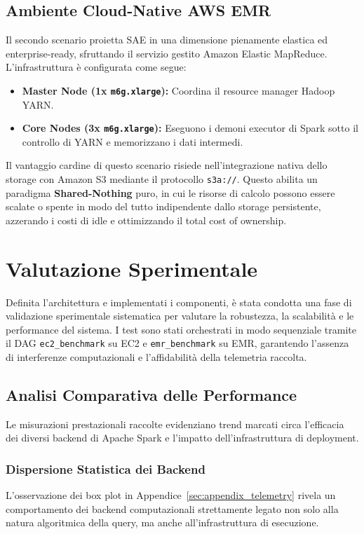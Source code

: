 \documentclass[conference]{IEEEtran}
\begin{document}
\subsection{Ambiente Cloud-Native AWS EMR}
Il secondo scenario proietta SAE in una dimensione pienamente elastica ed enterprise-ready, sfruttando il servizio gestito Amazon Elastic MapReduce.
L'infrastruttura è configurata come segue:
\begin{itemize}
    \item \textbf{Master Node (1x \texttt{m6g.xlarge}):} Coordina il resource manager Hadoop YARN.
    \item \textbf{Core Nodes (3x \texttt{m6g.xlarge}):} Eseguono i demoni executor di Spark sotto il controllo di YARN e memorizzano i dati intermedi.
\end{itemize}
Il vantaggio cardine di questo scenario risiede nell'integrazione nativa dello storage con Amazon S3 mediante il protocollo \texttt{s3a://}.
Questo abilita un paradigma \textbf{Shared-Nothing} puro, in cui le risorse di calcolo possono essere scalate o spente in modo del tutto indipendente dallo storage persistente, azzerando i costi di idle e ottimizzando il total cost of ownership\@.


\section{Valutazione Sperimentale}\label{sec:experimental_evaluation}
Definita l'architettura e implementati i componenti, è stata condotta una fase di validazione sperimentale sistematica per valutare la robustezza, la scalabilità e le performance del sistema.
I test sono stati orchestrati in modo sequenziale tramite il DAG \texttt{ec2\_benchmark} su EC2 e \texttt{emr\_benchmark} su EMR, garantendo l'assenza di interferenze computazionali e l'affidabilità della telemetria raccolta.

\subsection{Analisi Comparativa delle Performance}\label{subsec:performance_analysis}
Le misurazioni prestazionali raccolte evidenziano trend marcati circa l'efficacia dei diversi backend di Apache Spark e l'impatto dell'infrastruttura di deployment.

\subsubsection{Dispersione Statistica dei Backend}
L'osservazione dei box plot in Appendice~\ref{sec:appendix_telemetry} rivela un comportamento dei backend computazionali strettamente legato non solo alla natura algoritmica della query, ma anche all'infrastruttura di esecuzione.
\end{document}
